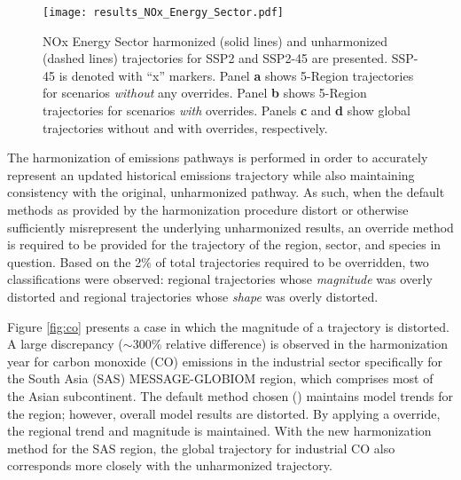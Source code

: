 \begin{figure}
  \begin{center}
    \texttt{[image: results\_NOx\_Energy\_Sector.pdf]}
    \caption[]{
      \label{fig:nox}
      NOx Energy Sector harmonized (solid lines) and unharmonized (dashed lines)
      trajectories for SSP2 and SSP2-45 are presented. SSP-45 is denoted with
      ``x'' markers. Panel \textbf{a} shows 5-Region trajectories for scenarios
      \textit{without} any overrides. Panel \textbf{b} shows 5-Region
      trajectories for scenarios \textit{with} overrides. Panels \textbf{c} and
      \textbf{d} show global trajectories without and with overrides,
      respectively.  }
  \end{center}
\end{figure}

The harmonization of emissions pathways is performed in order to accurately
represent an updated historical emissions trajectory while also maintaining
consistency with the original, unharmonized pathway. As such, when the default
methods as provided by the harmonization procedure distort or otherwise
sufficiently misrepresent the underlying unharmonized results, an override
method is required to be provided for the trajectory of the region, sector, and
species in question. Based on the 2\% of total trajectories required to be
overridden, two classifications were observed: regional trajectories whose
\textit{magnitude} was overly distorted and regional trajectories whose
\textit{shape} was overly distorted.

Figure \ref{fig:co} presents a case in which the magnitude of a trajectory is
distorted. A large discrepancy ($\sim$300\% relative difference) is
observed in the harmonization year for carbon monoxide (CO) emissions in the
industrial sector specifically for the South Asia (SAS) MESSAGE-GLOBIOM region,
which comprises most of the Asian subcontinent. The default method chosen
() maintains model trends for the region; however, overall
model results are distorted. By applying a  override, the
regional trend and magnitude is maintained. With the new harmonization method
for the SAS region, the global trajectory for industrial CO also corresponds
more closely with the unharmonized trajectory.

